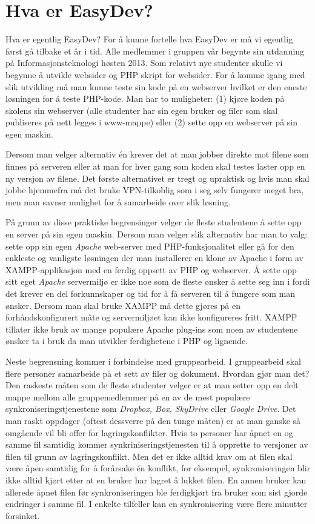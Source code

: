 \chapter{Hva er EasyDev?} \label{sec:hvaereasydev}

\lettrine[lines=2]{H}{}va er egentlig EasyDev? For å kunne fortelle hva EasyDev er må vi egentlig først gå tilbake et år i tid. Alle medlemmer i gruppen vår begynte sin utdanning på Informasjonsteknologi høsten 2013. Som relativt nye studenter skulle vi begynne å utvikle websider og PHP skript for websider. For å komme igang med slik utvikling må man kunne teste sin kode på en webserver hvilket er den eneste løsningen for å teste PHP-kode. 
Man har to muligheter: (1) kjøre koden på skolens sin webserver (alle studenter har sin egen bruker og filer som skal publiseres på nett legges i www-mappe) eller (2) sette opp en webserver på sin egen maskin.

Dersom man velger alternativ én krever det at man jobber direkte mot filene som finnes på serveren eller at man for hver gang som koden skal testes laster opp en ny versjon av filene. Det første alternativet er tregt og upraktisk og hvis man skal jobbe hjemmefra må det bruke VPN-tilkoblig som i seg selv fungerer meget bra, men man savner mulighet for å samarbeide over slik løsning.

På grunn av disse praktiske begrensinger velger de fleste studentene å sette opp en server på sin egen maskin. Dersom man velger slik alternativ har man to valg: sette opp sin egen \textit{Apache} web-server med PHP-funksjonalitet eller gå for den enkleste og vanligste løsningen der man installerer en klone av Apache i form av XAMPP-applikasjon med en ferdig oppsett av PHP og webserver. Å sette opp sitt eget \textit{Apache} servermiljø er ikke noe som de fleste ønsker å sette seg inn i fordi det krever en del forkunnskaper og tid for å få serveren til å fungere som man ønsker. Dersom man skal bruke XAMPP må dette gjøres på en forhåndskonfigurert måte og servermiljøet kan ikke konfigureres fritt. XAMPP tillater ikke bruk av mange populære Apache plug-ins som noen av studentene ønsker ta i bruk da man utvikler ferdighetene i PHP og lignende.

Neste begrensning kommer i forbindelse med gruppearbeid. I gruppearbeid skal flere personer samarbeide på et sett av filer og dokument. Hvordan gjør man det? Den raskeste måten som de fleste studenter velger er at man setter opp en delt mappe mellom alle gruppemedlemmer på en av de mest populære synkroniseringstjenestene som \textit{Dropbox, Box, SkyDrive} eller \textit{Google Drive}. Det man raskt oppdager (oftest dessverre på den tunge måten) er at man ganske så omgående vil bli offer for lagringskonflikter. Hvis to personer har åpnet en og samme fil samtidig kommer synkriniseringstjenesten til å opprette to versjoner av filen til grunn av lagringskonflikt. 
Men det er ikke alltid krav om at filen skal være åpen samtidig for å forårsake én konflikt, for eksempel, synkroniseringen blir ikke alltid kjørt etter at en bruker har lagret å lukket filen. 
En annen bruker kan allerede åpnet filen før synkroniseringen ble ferdigkjørt fra bruker som sist gjorde endringer i samme fil. I enkelte tilfeller kan en synkronisering være flere minutter forsinket. 

